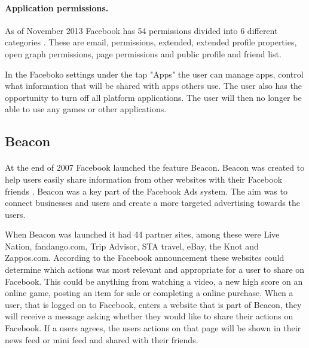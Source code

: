 \paragraph{Application permissions.} As of November 2013 Facebook has 54 permissions divided into 6 different categories \cite{permission}. These are email, permissions, extended, extended profile properties, open graph permissions, page permissions and public profile and friend list. 

In the Faceboko settings \cite{facebooksettings} under the tap "Apps" the user can manage apps, control what information that will be shared with apps others use. The user also has the opportunity to turn off all platform applications. The user will then no longer be able to use any games or other applications.

\subsection{Beacon}
\paragraph{}
At the end of 2007 Facebook launched the feature Beacon. Beacon was created to help users easily share information from other websites with their Facebook friends \cite{BeaconWebsites}. Beacon was a key part of the Facebook Ads system. The aim was to connect businesses and users and create a more targeted advertising towards the users. 

When Beacon was launched it had 44 partner sites, among these were Live Nation, fandango.com, Trip Advisor, STA travel, eBay, the Knot and Zappos.com. According to the Facebook announcement \cite{BeaconWebsites} these websites could determine which actions was most relevant and appropriate for a user to share on Facebook. This could be anything from watching a video, a new high score on an online game, posting an item for sale or completing a online purchase. When a user, that is logged on to Facebook, enters a website that is part of Beacon, they will receive a message asking whether they would like to share their actions on Facebook. If a users agrees, the users actions on that page will be shown in their news feed or mini feed and shared with their friends.  

